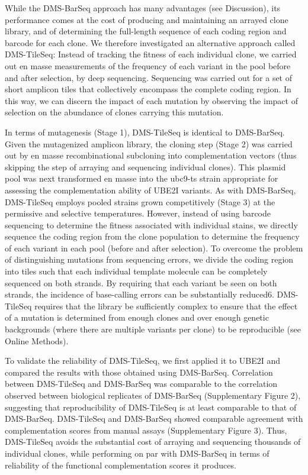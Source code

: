 While the DMS-BarSeq approach has many advantages (see Discussion), its performance comes at the cost of producing and maintaining an arrayed clone library, and of determining the full-length sequence of each coding region and barcode for each clone. We therefore investigated an alternative approach called DMS-TileSeq: Instead of tracking the fitness of each individual clone, we carried out en masse measurements of the frequency of each variant in the pool before and after selection, by deep sequencing.  Sequencing was carried out for a set of short amplicon tiles that collectively encompass the complete coding region.  In this way, we can discern the impact of each mutation by observing the impact of selection on the abundance of clones carrying this mutation.

In terms of mutagenesis (Stage 1), DMS-TileSeq is identical to DMS-BarSeq.  Given the mutagenized amplicon library, the cloning step (Stage 2) was carried out by en masse recombinational subcloning into complementation vectors (thus skipping the step of arraying and sequencing individual clones).  This plasmid pool was next transformed en masse into the ubc9-ts strain appropriate for assessing the complementation ability of UBE2I variants. As with DMS-BarSeq, DMS-TileSeq employs pooled strains grown competitively (Stage 3) at the permissive and selective temperatures. However, instead of using barcode sequencing to determine the fitness associated with individual stains, we directly sequence the coding region from the clone population to determine the frequency of each variant in each pool (before and after selection). To overcome the problem of distinguishing mutations from sequencing errors, we divide the coding region into tiles such that each individual template molecule can be completely sequenced on both strands.  By requiring that each variant be seen on both strands, the incidence of base-calling errors can be substantially reduced6.  DMS-TileSeq requires that the library be sufficiently complex to ensure that the effect of a mutation is determined from enough clones and over enough genetic backgrounds (where there are multiple variants per clone) to be reproducible (see Online Methods).

To validate the reliability of DMS-TileSeq, we first applied it to UBE2I and compared the results with those obtained using DMS-BarSeq. Correlation between DMS-TileSeq and DMS-BarSeq was comparable to the correlation observed between biological replicates of DMS-BarSeq (Supplementary Figure 2), suggesting that reproducibility of DMS-TileSeq is at least comparable to that of DMS-BarSeq. DMS-TileSeq and DMS-BarSeq showed comparable agreement with complementation scores from manual assays (Supplementary Figure 3).  Thus, DMS-TileSeq avoids the substantial cost of arraying and sequencing thousands of individual clones, while performing on par with DMS-BarSeq in terms of reliability of the functional complementation scores it produces.


